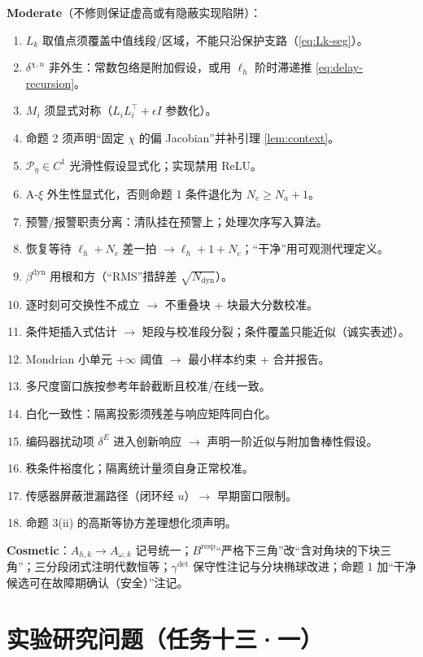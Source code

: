 \documentclass[11pt,a4paper]{ctexart}
\theoremstyle{remark}
\newcommand{\Prem}{\mathcal{P}_{\eta}}
\begin{document}
\textbf{Moderate}（不修则保证虚高或有隐蔽实现陷阱）：
\begin{enumerate}[label=M\arabic*.]
\item $L_k$ 取值点须覆盖中值线段/区域，不能只沿保护支路（\eqref{eq:Lk-seg}）。
\item $\delta^{\chi,n}$ 非外生：常数包络是附加假设，或用 $\ell_h$ 阶时滞递推 \eqref{eq:delay-recursion}。
\item $M_i$ 须显式对称（$L_iL_i^\top+\epsilon I$ 参数化）。
\item 命题 2 须声明“固定 $\chi$ 的偏 Jacobian”并补引理 \ref{lem:context}。
\item $\Prem\in C^1$ 光滑性假设显式化；实现禁用 ReLU。
\item A-$\xi$ 外生性显式化，否则命题 1 条件退化为 $N_c\ge N_a+1$。
\item 预警/报警职责分离：清队挂在预警上；处理次序写入算法。
\item 恢复等待 $\ell_h+N_c$ 差一拍 $\to\ell_h+1+N_c$；“干净”用可观测代理定义。
\item $\beta^{\mathrm{dyn}}$ 用根和方（“RMS”措辞差 $\sqrt{N_{\mathrm{dyn}}}$）。
\item 逐时刻可交换性不成立 $\to$ 不重叠块 + 块最大分数校准。
\item 条件矩插入式估计 $\to$ 矩段与校准段分裂；条件覆盖只能近似（诚实表述）。
\item Mondrian 小单元 $+\infty$ 阈值 $\to$ 最小样本约束 + 合并报告。
\item 多尺度窗口族按参考年龄截断且校准/在线一致。
\item 白化一致性：隔离投影须残差与响应矩阵同白化。
\item 编码器扰动项 $\delta^E$ 进入创新响应 $\to$ 声明一阶近似与附加鲁棒性假设。
\item 秩条件裕度化；隔离统计量须自身正常校准。
\item 传感器屏蔽泄漏路径（闭环经 $u$）$\to$ 早期窗口限制。
\item 命题 3(ii) 的高斯等协方差理想化须声明。
\end{enumerate}

\textbf{Cosmetic}：$A_{h,k}\to A_{\omega,k}$ 记号统一；$B^{\mathrm{resp}}$“严格下三角”改“含对角块的下块三角”；三分段闭式注明代数恒等；$\gamma^{\mathrm{det}}$ 保守性注记与分块椭球改进；命题 1 加“干净候选可在故障期确认（安全）”注记。

\section{实验研究问题（任务十三·一）}
\end{document}
